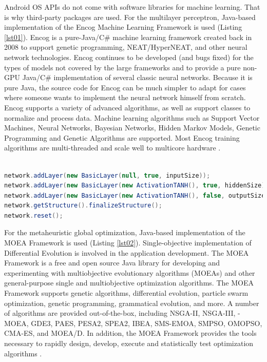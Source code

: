 \documentclass[a4paper,conference]{IEEEtran}
\begin{document}
Android OS APIs do not come with software libraries for machine learning. That is why third-party packages are used. For the multilayer perceptron, Java-based implementation of the Encog Machine Learning Framework is used (Listing \ref{lst01}). Encog is a pure-Java/C\# machine learning framework created back in 2008 to support genetic programming, NEAT/HyperNEAT, and other neural network technologies. Encog continues to be developed (and bugs fixed) for the types of models not covered by the large frameworks and to provide a pure non-GPU Java/C\# implementation of several classic neural networks. Because it is pure Java, the source code for Encog can be much simpler to adapt for cases where someone wants to implement the neural network himself from scratch. Encog supports a variety of advanced algorithms, as well as support classes to normalize and process data. Machine learning algorithms such as Support Vector Machines, Neural Networks, Bayesian Networks, Hidden Markov Models, Genetic Programming and Genetic Algorithms are supported. Most Encog training algorithms are multi-threaded and scale well to multicore hardware \cite{Heaton-01}.

\begin{lstlisting}[caption=Building artificial neural network, language=Java, basicstyle=\tiny, label=lst01]

network.addLayer(new BasicLayer(null, true, inputSize));
network.addLayer(new BasicLayer(new ActivationTANH(), true, hiddenSize));
network.addLayer(new BasicLayer(new ActivationTANH(), false, outputSize));
network.getStructure().finalizeStructure();
network.reset();

\end{lstlisting}

For the metaheuristic global optimization, Java-based implementation of the MOEA Framework is used (Listing \ref{lst02}). Single-objective implementation of Differential Evolution is involved in the application development. The MOEA Framework is a free and open source Java library for developing and experimenting with multiobjective evolutionary algorithms (MOEAs) and other general-purpose single and multiobjective optimization algorithms. The MOEA Framework supports genetic algorithms, differential evolution, particle swarm optimization, genetic programming, grammatical evolution, and more. A number of algorithms are provided out-of-the-box, including NSGA-II, NSGA-III, \varepsilon -MOEA, GDE3, PAES, PESA2, SPEA2, IBEA, SMS-EMOA, SMPSO, OMOPSO, CMA-ES, and MOEA/D. In addition, the MOEA Framework provides the tools necessary to rapidly design, develop, execute and statistically test optimization algorithms \cite{Hadka-01}.
\end{document}
